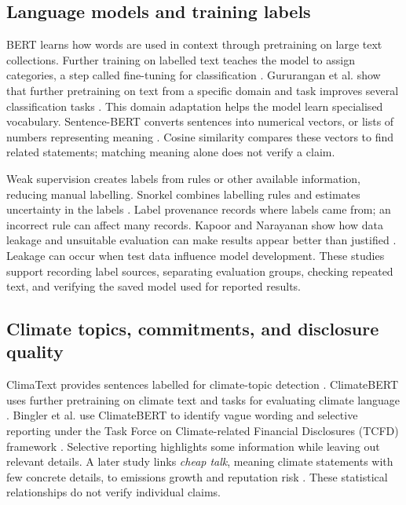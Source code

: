 \clearpage
\newsavebox{\literaturereviewpagebox}
\begin{lrbox}{\literaturereviewpagebox}
\begin{minipage}{\linewidth}
\setlength{\parskip}{5pt}
\subsection{Language models and training labels}

BERT learns how words are used in context through pretraining on large text collections. Further training on labelled text teaches the model to assign categories, a step called fine-tuning for classification \cite{devlin2019}. Gururangan et al. show that further pretraining on text from a specific domain and task improves several classification tasks \cite{gururangan2020}. This domain adaptation helps the model learn specialised vocabulary. Sentence-BERT converts sentences into numerical vectors, or lists of numbers representing meaning \cite{reimers2019}. Cosine similarity compares these vectors to find related statements; matching meaning alone does not verify a claim.

Weak supervision creates labels from rules or other available information, reducing manual labelling. Snorkel combines labelling rules and estimates uncertainty in the labels \cite{ratner2017}. Label provenance records where labels came from; an incorrect rule can affect many records. Kapoor and Narayanan show how data leakage and unsuitable evaluation can make results appear better than justified \cite{kapoor2023}. Leakage can occur when test data influence model development. These studies support recording label sources, separating evaluation groups, checking repeated text, and verifying the saved model used for reported results.

\subsection{Climate topics, commitments, and disclosure quality}

ClimaText provides sentences labelled for climate-topic detection \cite{varini2020}. ClimateBERT uses further pretraining on climate text and tasks for evaluating climate language \cite{webersinke2021}. Bingler et al. use ClimateBERT to identify vague wording and selective reporting under the Task Force on Climate-related Financial Disclosures (TCFD) framework \cite{bingler2022}. Selective reporting highlights some information while leaving out relevant details. A later study links \emph{cheap talk}, meaning climate statements with few concrete details, to emissions growth and reputation risk \cite{bingler2024}. These statistical relationships do not verify individual claims.


\end{minipage}
\end{lrbox}
